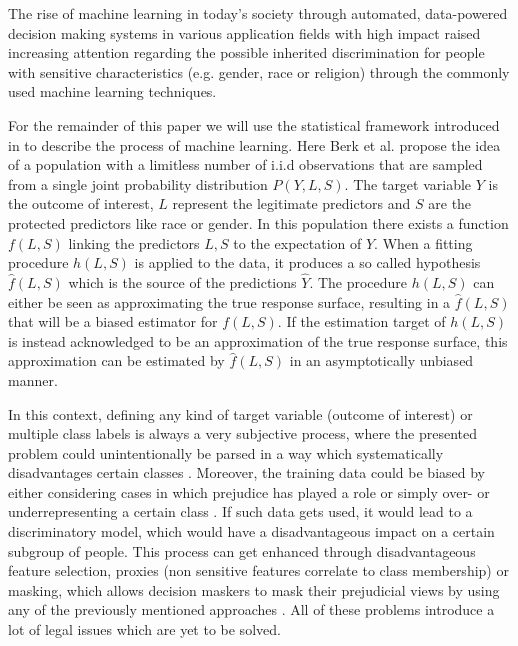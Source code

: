 The rise of machine learning in today's society through automated, data-powered decision making 
systems in various application fields with high impact raised increasing attention regarding the 
possible inherited discrimination for people with sensitive characteristics (e.g. gender, race or 
religion) through the commonly used machine learning techniques.

For the remainder of this paper we will use the statistical framework introduced in 
\cite{Berk.2018} to describe the process of machine learning. Here Berk et al. propose the idea of 
a population with a limitless number of i.i.d observations that are sampled from a single joint 
probability distribution $P(Y,L,S)$. 
The target variable $Y$ is the outcome of interest, $L$ represent the legitimate predictors and $S$ are the 
protected predictors like race or gender. In this population there exists a function $f(L,S)$ 
linking the predictors $L,S$ to the expectation of $Y$. When a fitting procedure $h(L,S)$ 
is applied to the data, it produces a so called hypothesis $\hat{f}(L,S)$ which is the 
source of the predictions $\hat{Y}$. The procedure $h(L,S)$ can either be seen as 
approximating the true response surface, resulting in a $\hat{f}(L,S)$ that will be a biased 
estimator for $f(L,S)$. If the estimation target of $h(L,S)$ is instead acknowledged to be 
an approximation of the true response surface, this approximation can be estimated by 
$\hat{f}(L,S)$ in an asymptotically unbiased manner.

In this context, defining any kind of target variable (outcome of interest) or multiple class labels 
is always a very subjective process, where the presented problem could unintentionally be parsed in a 
way which systematically disadvantages certain classes \cite{Barocas.2016, barocas-hardt-narayanan}. 
Moreover, the training data could be biased by either considering cases in which prejudice has played 
a role or simply over- or underrepresenting a certain class \cite{Barocas.2016, barocas-hardt-narayanan}. 
If such data gets used, it would lead to a discriminatory model, which would have a disadvantageous 
impact on a certain subgroup of people. This process can get enhanced through disadvantageous feature 
selection, proxies (non sensitive features correlate to class membership) or masking, which allows 
decision maskers to mask their prejudicial views by using any of the previously mentioned approaches 
\cite{Barocas.2016, barocas-hardt-narayanan}. All of these problems introduce a lot of legal issues 
which are yet to be solved. 
